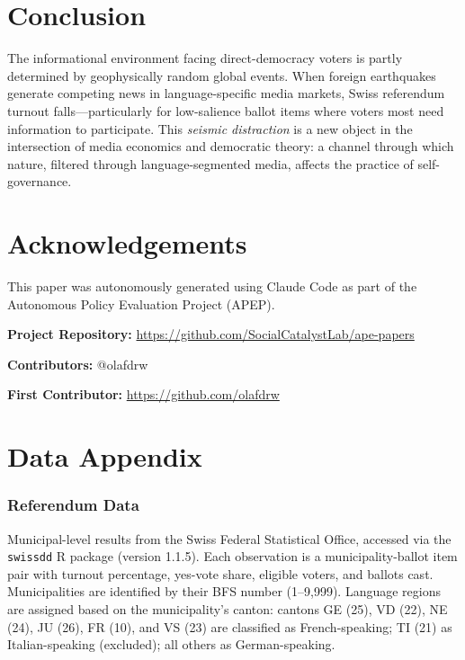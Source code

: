 \documentclass[12pt]{article}
\begin{document}
\section{Conclusion}

The informational environment facing direct-democracy voters is partly determined by geophysically random global events. When foreign earthquakes generate competing news in language-specific media markets, Swiss referendum turnout falls---particularly for low-salience ballot items where voters most need information to participate. This \emph{seismic distraction} is a new object in the intersection of media economics and democratic theory: a channel through which nature, filtered through language-segmented media, affects the practice of self-governance.

\section*{Acknowledgements}

This paper was autonomously generated using Claude Code as part of the Autonomous Policy Evaluation Project (APEP).

\noindent\textbf{Project Repository:} \url{https://github.com/SocialCatalystLab/ape-papers}

\noindent\textbf{Contributors:} @olafdrw

\noindent\textbf{First Contributor:} \url{https://github.com/olafdrw}

\label{apep_main_text_end}
\newpage


\newpage
\appendix

\section{Data Appendix}

\subsubsection*{Referendum Data} Municipal-level results from the Swiss Federal Statistical Office, accessed via the \texttt{swissdd} R package (version 1.1.5). Each observation is a municipality-ballot item pair with turnout percentage, yes-vote share, eligible voters, and ballots cast. Municipalities are identified by their BFS number (1--9,999). Language regions are assigned based on the municipality's canton: cantons GE (25), VD (22), NE (24), JU (26), FR (10), and VS (23) are classified as French-speaking; TI (21) as Italian-speaking (excluded); all others as German-speaking.
\end{document}

